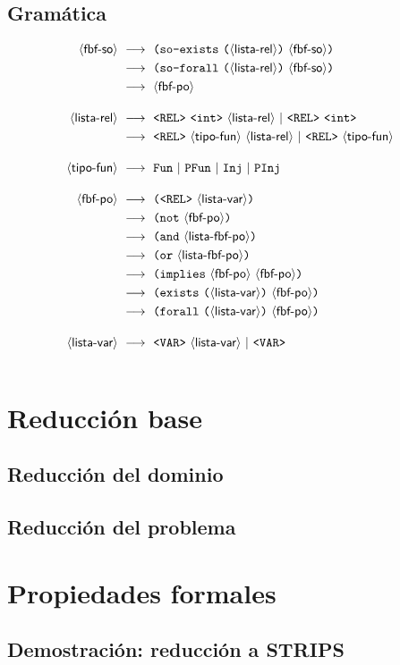 \subsection{Gramática}
\begin{alignat*}{1}
\sofbf\   & \deriv\ \lpar \SOExists\ \lpar \listrel \rpar\ \sofbf \rpar \\
          & \deriv\ \lpar \SOForall\ \lpar \listrel \rpar\ \sofbf \rpar \\
          & \deriv\ \pofbf \\[1em]
\listrel\ & \deriv\ \rel\ \integer\ \listrel\ |\ \rel\ \integer \\
          & \deriv\ \rel\ \tipof\ \listrel\ |\ \rel\ \tipof\ \\[1em]
\tipof\   & \deriv\ \fun\ |\ \pfun\ |\ \inj\ |\ \pinj\ \\[1em]
\pofbf\   & \deriv\ \lpar \rel\ \listvar \rpar \\
          & \deriv\ \lpar \NOT\ \pofbf \rpar \\
          & \deriv\ \lpar \AND\ \listpofbf \rpar \\
          & \deriv\ \lpar \OR\ \listpofbf \rpar \\
          & \deriv\ \lpar \IMPLIES\ \pofbf\ \pofbf \rpar \\
          & \deriv\ \lpar \Exists\ \lpar \listvar \rpar\ \pofbf \rpar \\
          & \deriv\ \lpar \Forall\ \lpar \listvar \rpar\ \pofbf \rpar \\[1em]
\listvar\ & \deriv\ \var\ \listvar\ |\ \var \\[1em]
\end{alignat*}

\section{Reducción base}
\subsection{Reducción del dominio}
\subsection{Reducción del problema}

\section{Propiedades formales}
\subsection{Demostración: reducción a STRIPS}

